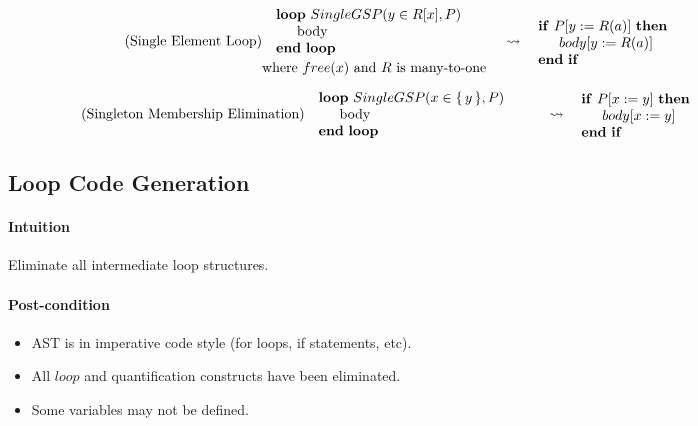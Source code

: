 \noindent\begin{minipage}{\linewidth}
\begin{align}
  \tag{Single Element Loop}
  \begin{minipage}[]{0.5\textwidth}
  \begin{algorithmic}
    \Loop\ $SingleGSP(y \in R[x], P)$
      \State body
    \EndLoop
  \end{algorithmic}
  \text{where $free(x)$ and $R$ is many-to-one}
  \end{minipage}
  &\leadsto
  \begin{minipage}[]{0.5\textwidth}
  \begin{algorithmic}
    \If{$P[y:=R(a)]$}
      \State $body[y:=R(a)]$
    \EndIf
  \end{algorithmic}
  \end{minipage}
\end{align}
\end{minipage}
\noindent\begin{minipage}{\linewidth}
\begin{align}
  \tag{Singleton Membership Elimination}
  \begin{minipage}[]{0.5\textwidth}
  \begin{algorithmic}
    \Loop\ $SingleGSP(x \in \Set{y}, P)$
      \State body
    \EndLoop
  \end{algorithmic}
  \end{minipage}
  &\leadsto
  \begin{minipage}[]{0.5\textwidth}
  \begin{algorithmic}
    \If{$P[x:=y]$}
      \State $body[x:=y]$
    \EndIf
  \end{algorithmic}
  \end{minipage}
\end{align}
\end{minipage}

\subsection{Loop Code Generation}

\paragraph{Intuition} Eliminate all intermediate loop structures.

\paragraph{Post-condition}
\begin{itemize}
  \item AST is in imperative code style (for loops, if statements, etc).
  \item All $loop$ and quantification constructs have been eliminated.
  \item Some variables may not be defined.
\end{itemize}

